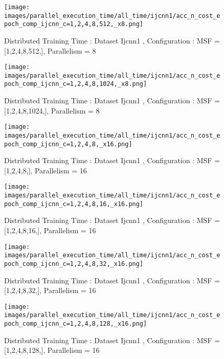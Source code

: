 \begin{figure*}[htbp]
\centering
\texttt{[image: images/parallel\_execution\_time/all\_time/ijcnn1/acc\_n\_cost\_epoch\_comp\_ijcnn\_c=1,2,4,8,512,\_x8.png]}
\caption{Distributed Training Time : Dataset Ijcnn1 , Configuration : MSF = [1,2,4,8,512,], Parallelism = 8}
\label{fig:dis-msf-tr-time-ijcnn1-x8}
\end{figure*}


\begin{figure*}[htbp]
\centering
\texttt{[image: images/parallel\_execution\_time/all\_time/ijcnn1/acc\_n\_cost\_epoch\_comp\_ijcnn\_c=1,2,4,8,1024,\_x8.png]}
\caption{Distributed Training Time : Dataset Ijcnn1 , Configuration : MSF = [1,2,4,8,1024,], Parallelism = 8}
\label{fig:dis-msf-tr-time-ijcnn1-x8}
\end{figure*}


\begin{figure*}[htbp]
\centering
\texttt{[image: images/parallel\_execution\_time/all\_time/ijcnn1/acc\_n\_cost\_epoch\_comp\_ijcnn\_c=1,2,4,8,\_x16.png]}
\caption{Distributed Training Time : Dataset Ijcnn1 , Configuration : MSF = [1,2,4,8,], Parallelism = 16}
\label{fig:dis-msf-tr-time-ijcnn1-x16}
\end{figure*}


\begin{figure*}[htbp]
\centering
\texttt{[image: images/parallel\_execution\_time/all\_time/ijcnn1/acc\_n\_cost\_epoch\_comp\_ijcnn\_c=1,2,4,8,16,\_x16.png]}
\caption{Distributed Training Time : Dataset Ijcnn1 , Configuration : MSF = [1,2,4,8,16,], Parallelism = 16}
\label{fig:dis-msf-tr-time-ijcnn1-x16}
\end{figure*}


\begin{figure*}[htbp]
\centering
\texttt{[image: images/parallel\_execution\_time/all\_time/ijcnn1/acc\_n\_cost\_epoch\_comp\_ijcnn\_c=1,2,4,8,32,\_x16.png]}
\caption{Distributed Training Time : Dataset Ijcnn1 , Configuration : MSF = [1,2,4,8,32,], Parallelism = 16}
\label{fig:dis-msf-tr-time-ijcnn1-x16}
\end{figure*}


\begin{figure*}[htbp]
\centering
\texttt{[image: images/parallel\_execution\_time/all\_time/ijcnn1/acc\_n\_cost\_epoch\_comp\_ijcnn\_c=1,2,4,8,128,\_x16.png]}
\caption{Distributed Training Time : Dataset Ijcnn1 , Configuration : MSF = [1,2,4,8,128,], Parallelism = 16}
\label{fig:dis-msf-tr-time-ijcnn1-x16}
\end{figure*}


